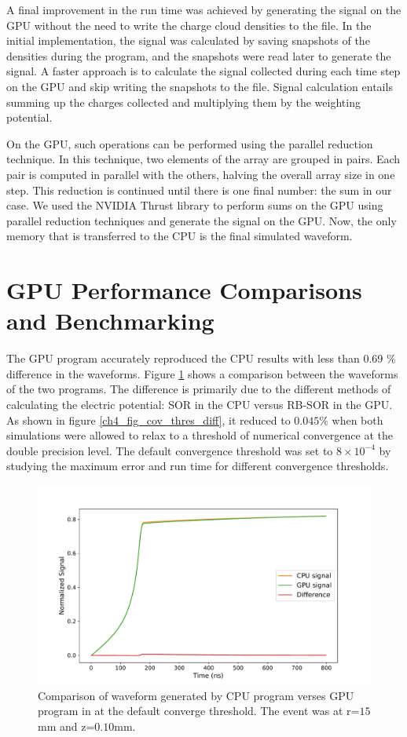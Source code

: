 A final improvement in the run time was achieved by generating the signal on the GPU without the need to write the charge cloud densities to the file. In the initial implementation, the signal was calculated by saving snapshots of the densities during the program, and the snapshots were read later to generate the signal. A faster approach is to calculate the signal collected during each time step on the GPU and skip writing the snapshots to the file. Signal calculation entails summing up the charges collected and multiplying them by the weighting potential. 

On the GPU, such operations can be performed using the parallel reduction technique. In this technique, two elements of the array are grouped in pairs. Each pair is computed in parallel with the others, halving the overall array size in one step. This reduction is continued until there is one final number: the sum in our case. We used the NVIDIA Thrust library to perform sums on the GPU using parallel reduction techniques and generate the signal on the GPU. Now, the only memory that is transferred to the CPU is the final simulated waveform.

\section{GPU Performance Comparisons and Benchmarking}
The GPU program accurately reproduced the CPU results with less than 0.69 $\%$ difference in the waveforms. Figure \ref{ch4_fig_waveform_comp} shows a comparison between the waveforms of the two programs.  The difference is primarily due to the different methods of calculating the electric potential: SOR in the CPU versus RB-SOR in the GPU. As shown in figure \ref{ch4_fig_cov_thres_diff}, it reduced to $0.045\%$ when both simulations were allowed to relax to a threshold of numerical convergence at the double precision level. The default convergence threshold was set to $8\times10^{-4}$ by studying the maximum error and run time for different convergence thresholds.

\begin{figure}[!ht]
\centering
 \includegraphics[width=0.99\linewidth]{ch4/figs/cpu_gpu_wf.pdf}
\caption{Comparison of waveform generated by CPU program verses GPU program in {\ehd} at the default converge threshold. The event was at r=$15$mm and z=$0.10$mm.}
\label{ch4_fig_waveform_comp}
\end{figure}

